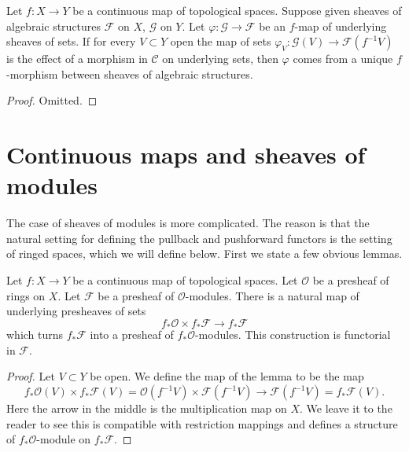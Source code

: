 \begin{lemma}
\label{lemma-f-map-sets-algebraic-structures}
Let $f : X \to Y$ be a continuous map of topological spaces.
Suppose given sheaves of algebraic structures
$\mathcal{F}$ on $X$, $\mathcal{G}$ on $Y$. Let
$\varphi : \mathcal{G} \to \mathcal{F}$ be an $f$-map
of underlying sheaves of sets. If for every $V \subset Y$ open the
map of sets $\varphi_V : \mathcal{G}(V) \to \mathcal{F}(f^{-1}V)$
is the effect of a morphism in $\mathcal{C}$ on underlying sets,
then $\varphi$ comes from a unique $f$-morphism between
sheaves of algebraic structures.
\end{lemma}

\begin{proof}
Omitted.
\end{proof}




\section{Continuous maps and sheaves of modules}
\label{section-presheaves-modules-functorial}

\noindent
The case of sheaves of modules is more complicated.
The reason is that the natural setting for defining
the pullback and pushforward functors is the setting
of ringed spaces, which we will define below. First
we state a few obvious lemmas.

\begin{lemma}
\label{lemma-pushforward-presheaf-module}
Let $f : X \to Y$ be a continuous map of topological spaces.
Let $\mathcal{O}$ be a presheaf of rings on $X$. Let
$\mathcal{F}$ be a presheaf of $\mathcal{O}$-modules.
There is a natural map of underlying presheaves of sets
$$
f_*\mathcal{O} \times f_*\mathcal{F}
\longrightarrow
f_*\mathcal{F}
$$
which turns $f_*\mathcal{F}$ into a presheaf of
$f_*\mathcal{O}$-modules. This construction is
functorial in $\mathcal{F}$.
\end{lemma}

\begin{proof}
Let $V \subset Y$ be open. We define the map of the lemma
to be the map
$$
f_*\mathcal{O}(V) \times f_*\mathcal{F}(V)
=
\mathcal{O}(f^{-1}V) \times \mathcal{F}(f^{-1}V)
\to
\mathcal{F}(f^{-1}V)
=
f_*\mathcal{F}(V).
$$
Here the arrow in the middle is the multiplication map on $X$.
We leave it to the reader to see this is compatible with
restriction mappings and defines a structure of
$f_*\mathcal{O}$-module on $f_*\mathcal{F}$.
\end{proof}

